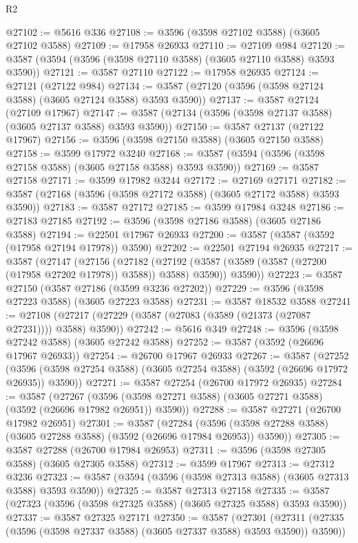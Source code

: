\begin{lexlean}{R2}
\begin{coremodule}
@27102 := @5616 @336
@27108 := @3596 (@3598 @27102 @3588) (@3605 @27102 @3588)
@27109 := @17958 @26933
@27110 := @27109 @984
@27120 := @3587 (@3594 (@3596 (@3598 @27110 @3588) (@3605 @27110 @3588) @3593 @3590))
@27121 := @3587 @27110
@27122 := @17958 @26935
@27124 := @27121 (@27122 @984)
@27134 := @3587 (@27120 (@3596 (@3598 @27124 @3588) (@3605 @27124 @3588) @3593 @3590))
@27137 := @3587 @27124 (@27109 @17967)
@27147 := @3587 (@27134 (@3596 (@3598 @27137 @3588) (@3605 @27137 @3588) @3593 @3590))
@27150 := @3587 @27137 (@27122 @17967)
@27156 := @3596 (@3598 @27150 @3588) (@3605 @27150 @3588)
@27158 := @3599 @17972 @3240
@27168 := @3587 (@3594 (@3596 (@3598 @27158 @3588) (@3605 @27158 @3588) @3593 @3590))
@27169 := @3587 @27158
@27171 := @3599 @17982 @3244
@27172 := @27169 @27171
@27182 := @3587 (@27168 (@3596 (@3598 @27172 @3588) (@3605 @27172 @3588) @3593 @3590))
@27183 := @3587 @27172
@27185 := @3599 @17984 @3248
@27186 := @27183 @27185
@27192 := @3596 (@3598 @27186 @3588) (@3605 @27186 @3588)
@27194 := @22501 @17967 @26933
@27200 := @3587 (@3587 (@3592 (@17958 @27194 @17978)) @3590)
@27202 := @22501 @27194 @26935
@27217 := @3587
    (@27147
      (@27156
        (@27182 (@27192 (@3587 (@3589 (@3587 (@27200 (@17958 @27202 @17978)) @3588)) @3588) @3590))
        @3590))
@27223 := @3587 @27150 (@3587 @27186 (@3599 @3236 @27202))
@27229 := @3596 (@3598 @27223 @3588) (@3605 @27223 @3588)
@27231 := @3587 @18532 @3588
@27241 := @27108 (@27217 (@27229 (@3587 (@27083 (@3589 (@21373 (@27087 @27231)))) @3588) @3590))
@27242 := @5616 @349
@27248 := @3596 (@3598 @27242 @3588) (@3605 @27242 @3588)
@27252 := @3587 (@3592 (@26696 @17967 @26933))
@27254 := @26700 @17967 @26933
@27267 := @3587
    (@27252 (@3596 (@3598 @27254 @3588) (@3605 @27254 @3588) (@3592 (@26696 @17972 @26935)) @3590))
@27271 := @3587 @27254 (@26700 @17972 @26935)
@27284 := @3587
    (@27267 (@3596 (@3598 @27271 @3588) (@3605 @27271 @3588) (@3592 (@26696 @17982 @26951)) @3590))
@27288 := @3587 @27271 (@26700 @17982 @26951)
@27301 := @3587
    (@27284 (@3596 (@3598 @27288 @3588) (@3605 @27288 @3588) (@3592 (@26696 @17984 @26953)) @3590))
@27305 := @3587 @27288 (@26700 @17984 @26953)
@27311 := @3596 (@3598 @27305 @3588) (@3605 @27305 @3588)
@27312 := @3599 @17967
@27313 := @27312 @3236
@27323 := @3587 (@3594 (@3596 (@3598 @27313 @3588) (@3605 @27313 @3588) @3593 @3590))
@27325 := @3587 @27313 @27158
@27335 := @3587 (@27323 (@3596 (@3598 @27325 @3588) (@3605 @27325 @3588) @3593 @3590))
@27337 := @3587 @27325 @27171
@27350 := @3587
    (@27301 (@27311 (@27335 (@3596 (@3598 @27337 @3588) (@3605 @27337 @3588) @3593 @3590)) @3590))

\end{coremodule}
\end{lexlean}
